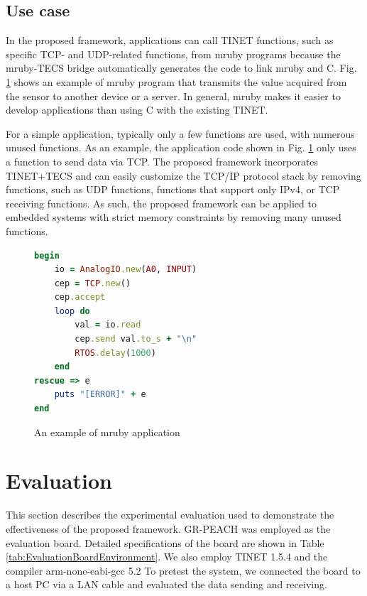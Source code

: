 \documentclass[JIP]{ipsj_v2/UTF8/ipsj}
\begin{document}
\subsection{Use case}
\label{sec:UseCase}

In the proposed framework, applications can call TINET functions, such as specific TCP- and UDP-related functions, from mruby programs because the mruby-TECS bridge automatically generates the code to link mruby and C.
Fig. \ref{src:mruby} shows an example of mruby program that transmits the value acquired from the sensor to another device or a server.
In general, mruby makes it easier to develop applications than using C with the existing TINET.

For a simple application, typically only a few functions are used, with numerous unused functions.
As an example, the application code shown in Fig. \ref{src:mruby} only uses a function to send data via TCP.
The proposed framework incorporates TINET+TECS and can easily customize the TCP/IP protocol stack by removing functions, such as UDP functions, functions that support only IPv4, or TCP receiving functions.
As such, the proposed framework can be applied to embedded systems with strict memory constraints by removing many unused functions.


\begin{figure}[t]
\centering
\begin{lstlisting}[language=Ruby]
begin
    io = AnalogIO.new(A0, INPUT)
    cep = TCP.new()	
    cep.accept
    loop do		
        val = io.read  
        cep.send val.to_s + "\n"		
        RTOS.delay(1000)			
    end
rescue => e	
    puts "[ERROR]" + e
end
\end{lstlisting}
\caption{An example of mruby application}
\label{src:mruby}
\end{figure}

\section{Evaluation}
\label{sec:Evaluation}

This section describes the experimental evaluation used to demonstrate the effectiveness of the proposed framework.
GR-PEACH was employed as the evaluation board.
Detailed specifications of the board are shown in Table \ref{tab:EvaluationBoardEnvironment}.
We also employ TINET 1.5.4 and the compiler arm-none-eabi-gcc 5.2
To pretest the system, we connected the board to a host PC via a LAN cable and evaluated the data sending and receiving.
\end{document}
